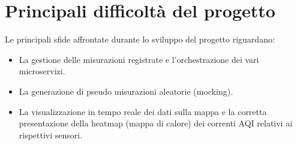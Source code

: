 \section{Principali difficoltà del progetto}

Le principali sfide affrontate durante lo sviluppo del progetto riguardano:

\begin{itemize}
    \item La gestione delle misurazioni registrate e l'orchestrazione dei vari microservizi.
    \item La generazione di pseudo misurazioni aleatorie (mocking).
    \item La visualizzazione in tempo reale dei dati sulla mappa e la corretta presentazione della heatmap (mappa di calore) dei correnti AQI relativi ai rispettivi sensori.
\end{itemize}
